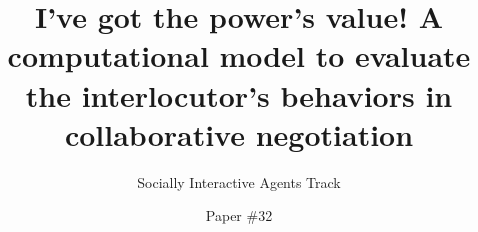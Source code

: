 \documentclass[sigconf]{aamas}  %
\begin{document}
	
	\title{I've got the power's value! A computational model to evaluate the interlocutor's behaviors in collaborative negotiation}  %

	\subtitle{Socially Interactive Agents Track}

	
	\author{Paper \#32}  %
	

	
	
	\begin{abstract}  %
		
	
		
	\end{abstract}
	
\end{document}

